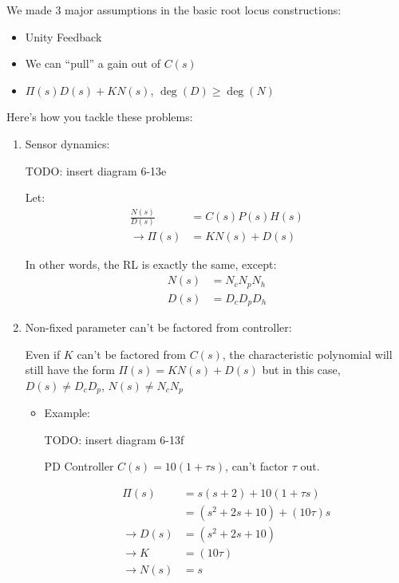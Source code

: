 \begin{enumerate}
        We made 3 major assumptions in the basic root locus constructions:
        \begin{itemize}
            \item Unity Feedback
            \item We can ``pull'' a gain out of $C(s)$
            \item $\Pi(s) D(s) + K N(s)$, $\deg(D) \ge \deg(N)$
        \end{itemize}
        Here's how you tackle these problems:
        \begin{enumerate}
            \item Sensor dynamics:

                TODO: insert diagram 6-13e

                Let:
                \begin{align*}
                    \frac{N(s)}{D(s)} &= C(s) P(s) H(s)\\
                    \rightarrow \Pi(s) &= KN(s) + D(s)
                \end{align*}

                In other words, the RL is exactly the same, except:
                \begin{align*}
                    N(s) &= N_c N_p N_h \\
                    D(s) &= D_c D_p D_h
                \end{align*}
            \item Non-fixed parameter can't be factored from controller:

                Even if $K$ can't be factored from $C(s)$, the characteristic polynomial will still have the form
                $\Pi(s) = KN(s) + D(s)$ but in this case, $D(s) \ne D_c D_p$, $N(s) \ne N_c N_p$

                \begin{itemize}
                    \item Example:

                        TODO: insert diagram 6-13f

                        PD Controller $C(s) = 10 (1+ \tau s)$, can't factor $\tau$ out.

                        \begin{align*}
                            \Pi(s) &= s(s+2) + 10 (1 + \tau s)\\
                            &= (s^2 + 2s + 10) + (10\tau) s\\
                            \rightarrow D(s) &= (s^2 + 2s + 10)\\
                            \rightarrow K &= (10\tau) \\
                            \rightarrow N(s) &= s
                        \end{align*}


\end{itemize}
\end{enumerate}
\end{enumerate}
